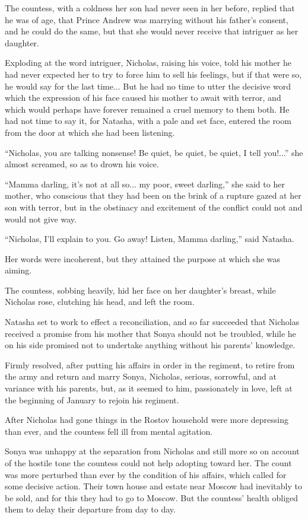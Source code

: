 The countess, with a coldness her son had never seen in her
before, replied that he was of age, that Prince Andrew was
marrying without his father's consent, and he could do the same,
but that she would never receive that intriguer as her daughter.

Exploding at the word intriguer, Nicholas, raising his voice,
told his mother he had never expected her to try to force him to
sell his feelings, but if that were so, he would say for the last
time... But he had no time to utter the decisive word which the
expression of his face caused his mother to await with terror,
and which would perhaps have forever remained a cruel memory to
them both. He had not time to say it, for Natasha, with a pale
and set face, entered the room from the door at which she had
been listening.

``Nicholas, you are talking nonsense! Be quiet, be quiet, be
quiet, I tell you!...'' she almost screamed, so as to drown his
voice.

``Mamma darling, it's not at all so... my poor, sweet darling,''
she said to her mother, who conscious that they had been on the
brink of a rupture gazed at her son with terror, but in the
obstinacy and excitement of the conflict could not and would not
give way.

``Nicholas, I'll explain to you. Go away! Listen, Mamma
darling,'' said Natasha.

Her words were incoherent, but they attained the purpose at which
she was aiming.

The countess, sobbing heavily, hid her face on her daughter's
breast, while Nicholas rose, clutching his head, and left the
room.

Natasha set to work to effect a reconciliation, and so far
succeeded that Nicholas received a promise from his mother that
Sonya should not be troubled, while he on his side promised not
to undertake anything without his parents' knowledge.

Firmly resolved, after putting his affairs in order in the
regiment, to retire from the army and return and marry Sonya,
Nicholas, serious, sorrowful, and at variance with his parents,
but, as it seemed to him, passionately in love, left at the
beginning of January to rejoin his regiment.

After Nicholas had gone things in the Rostov household were more
depressing than ever, and the countess fell ill from mental
agitation.

Sonya was unhappy at the separation from Nicholas and still more
so on account of the hostile tone the countess could not help
adopting toward her. The count was more perturbed than ever by
the condition of his affairs, which called for some decisive
action. Their town house and estate near Moscow had inevitably to
be sold, and for this they had to go to Moscow. But the countess'
health obliged them to delay their departure from day to day.

